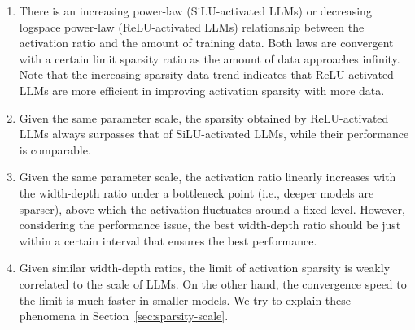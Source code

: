 \documentclass{article} %
\begin{document}
\begin{enumerate}
    \item There is an increasing power-law (SiLU-activated LLMs) or decreasing logspace power-law (ReLU-activated LLMs) relationship between the activation ratio and the amount of training data. Both laws are convergent with a certain limit sparsity ratio as the amount of data approaches infinity. Note that the increasing sparsity-data trend indicates that ReLU-activated LLMs are more efficient in improving activation sparsity with more data.
    \item Given the same parameter scale, the sparsity obtained by ReLU-activated LLMs always surpasses that of SiLU-activated LLMs, while their performance is comparable.
    \item Given the same parameter scale, the activation ratio linearly increases with the width-depth ratio under a bottleneck point (i.e., deeper models are sparser), above which the activation fluctuates around a fixed level. However, considering the performance issue, the best width-depth ratio should be just within a certain interval that ensures the best performance.
    \item Given similar width-depth ratios, the limit of activation sparsity is weakly correlated to the scale of LLMs. On the other hand, the convergence speed to the limit is much faster in smaller models. We try to explain these phenomena in Section~\ref{sec:sparsity-scale}.
\end{enumerate}

\end{document}
